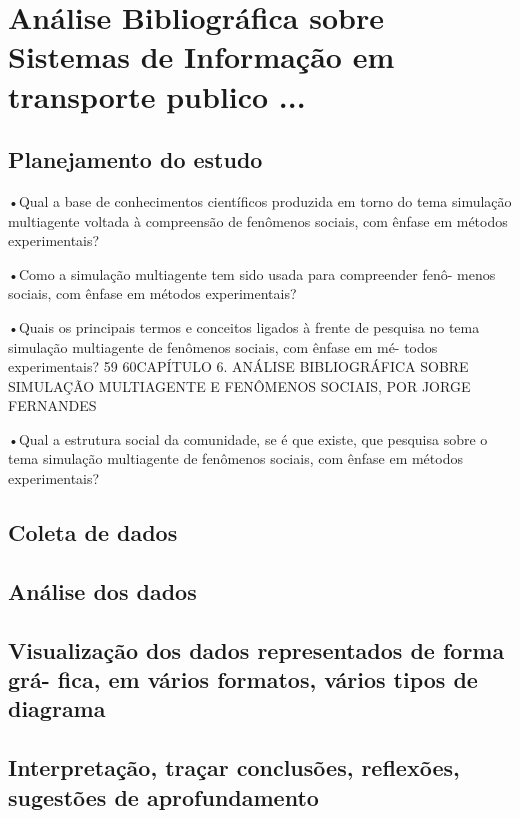 \chapter{Análise Bibliográfica sobre Sistemas de Informação em transporte publico ...\label{chap:bibliometria:MoustacheGolem}}

\section{Planejamento do estudo}


•Qual a base de conhecimentos científicos produzida em torno do tema
simulação multiagente voltada à compreensão de fenômenos sociais,
com ênfase em métodos experimentais?

•Como a simulação multiagente tem sido usada para compreender fenô-
menos sociais, com ênfase em métodos experimentais?

•Quais os principais termos e conceitos ligados à frente de pesquisa no
tema simulação multiagente de fenômenos sociais, com ênfase em mé-
todos experimentais?
59
60CAPÍTULO 6. ANÁLISE BIBLIOGRÁFICA SOBRE SIMULAÇÃO MULTIAGENTE E FENÔMENOS SOCIAIS, POR JORGE FERNANDES

•Qual a estrutura social da comunidade, se é que existe, que pesquisa
sobre o tema simulação multiagente de fenômenos sociais, com ênfase
em métodos experimentais?
\section{Coleta de dados}

\section{Análise dos dados}

\section{Visualização dos dados representados de forma grá-
fica, em vários formatos, vários tipos de diagrama}

\section{Interpretação, traçar conclusões, reflexões, sugestões de
aprofundamento}
